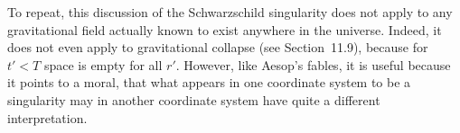 To repeat, this discussion of the Schwarzschild singularity does not apply
to any gravitational field actually known to exist anywhere in the
universe. Indeed, it does not even apply to gravitational collapse (see
Section~11.9), because for \(t'<T\) space is empty for all \(r'\). However,
like Aesop's fables, it is useful because it points to a moral, that what
appears in one coordinate system to be a singularity may in another
coordinate system have quite a different interpretation.
